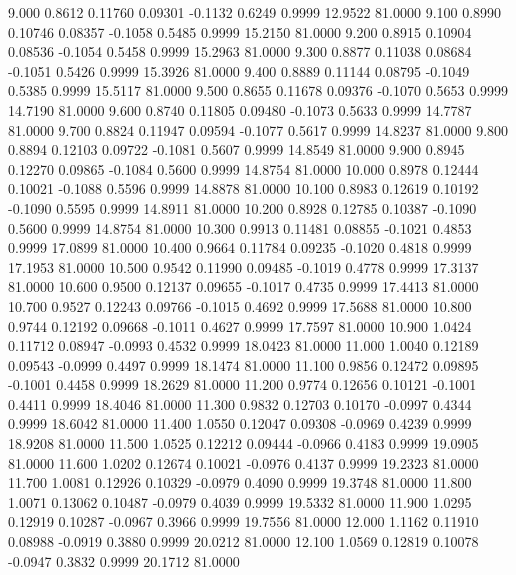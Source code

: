    9.000   0.8612   0.11760   0.09301  -0.1132   0.6249   0.9999  12.9522  81.0000
   9.100   0.8990   0.10746   0.08357  -0.1058   0.5485   0.9999  15.2150  81.0000
   9.200   0.8915   0.10904   0.08536  -0.1054   0.5458   0.9999  15.2963  81.0000
   9.300   0.8877   0.11038   0.08684  -0.1051   0.5426   0.9999  15.3926  81.0000
   9.400   0.8889   0.11144   0.08795  -0.1049   0.5385   0.9999  15.5117  81.0000
   9.500   0.8655   0.11678   0.09376  -0.1070   0.5653   0.9999  14.7190  81.0000
   9.600   0.8740   0.11805   0.09480  -0.1073   0.5633   0.9999  14.7787  81.0000
   9.700   0.8824   0.11947   0.09594  -0.1077   0.5617   0.9999  14.8237  81.0000
   9.800   0.8894   0.12103   0.09722  -0.1081   0.5607   0.9999  14.8549  81.0000
   9.900   0.8945   0.12270   0.09865  -0.1084   0.5600   0.9999  14.8754  81.0000
  10.000   0.8978   0.12444   0.10021  -0.1088   0.5596   0.9999  14.8878  81.0000
  10.100   0.8983   0.12619   0.10192  -0.1090   0.5595   0.9999  14.8911  81.0000
  10.200   0.8928   0.12785   0.10387  -0.1090   0.5600   0.9999  14.8754  81.0000
  10.300   0.9913   0.11481   0.08855  -0.1021   0.4853   0.9999  17.0899  81.0000
  10.400   0.9664   0.11784   0.09235  -0.1020   0.4818   0.9999  17.1953  81.0000
  10.500   0.9542   0.11990   0.09485  -0.1019   0.4778   0.9999  17.3137  81.0000
  10.600   0.9500   0.12137   0.09655  -0.1017   0.4735   0.9999  17.4413  81.0000
  10.700   0.9527   0.12243   0.09766  -0.1015   0.4692   0.9999  17.5688  81.0000
  10.800   0.9744   0.12192   0.09668  -0.1011   0.4627   0.9999  17.7597  81.0000
  10.900   1.0424   0.11712   0.08947  -0.0993   0.4532   0.9999  18.0423  81.0000
  11.000   1.0040   0.12189   0.09543  -0.0999   0.4497   0.9999  18.1474  81.0000
  11.100   0.9856   0.12472   0.09895  -0.1001   0.4458   0.9999  18.2629  81.0000
  11.200   0.9774   0.12656   0.10121  -0.1001   0.4411   0.9999  18.4046  81.0000
  11.300   0.9832   0.12703   0.10170  -0.0997   0.4344   0.9999  18.6042  81.0000
  11.400   1.0550   0.12047   0.09308  -0.0969   0.4239   0.9999  18.9208  81.0000
  11.500   1.0525   0.12212   0.09444  -0.0966   0.4183   0.9999  19.0905  81.0000
  11.600   1.0202   0.12674   0.10021  -0.0976   0.4137   0.9999  19.2323  81.0000
  11.700   1.0081   0.12926   0.10329  -0.0979   0.4090   0.9999  19.3748  81.0000
  11.800   1.0071   0.13062   0.10487  -0.0979   0.4039   0.9999  19.5332  81.0000
  11.900   1.0295   0.12919   0.10287  -0.0967   0.3966   0.9999  19.7556  81.0000
  12.000   1.1162   0.11910   0.08988  -0.0919   0.3880   0.9999  20.0212  81.0000
  12.100   1.0569   0.12819   0.10078  -0.0947   0.3832   0.9999  20.1712  81.0000
